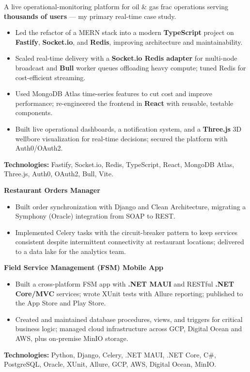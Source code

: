 \documentclass[10pt,a4paper]{altacv}
\begin{document}
A live operational-monitoring platform for oil \& gas frac operations serving \textbf{thousands of users} — my primary real-time case study.
\begin{itemize}
\setlength{\itemindent}{0.5em}
\item[--] Led the refactor of a MERN stack into a modern \textbf{TypeScript} project on \textbf{Fastify}, \textbf{Socket.io}, and \textbf{Redis}, improving architecture and maintainability.
\item[--] Scaled real-time delivery with a \textbf{Socket.io Redis adapter} for multi-node broadcast and \textbf{Bull} worker queues offloading heavy compute; tuned Redis for cost-efficient streaming.
\item[--] Used MongoDB Atlas time-series features to cut cost and improve performance; re-engineered the frontend in \textbf{React} with reusable, testable components.
\item[--] Built live operational dashboards, a notification system, and a \textbf{Three.js} 3D wellbore visualization for real-time decisions; secured the platform with Auth0/OAuth2.
\end{itemize}
\textbf{Technologies:} Fastify, Socket.io, Redis, TypeScript, React, MongoDB Atlas, Three.js, Auth0, OAuth2, Bull, Vite.
\vspace{4mm}


\textbf{Restaurant Orders Manager}
\begin{itemize}
    \setlength{\itemindent}{0.5em}
    \item[--] Built order synchronization with Django and Clean Architecture, migrating a Symphony (Oracle) integration from SOAP to REST.
    \item[--] Implemented Celery tasks with the circuit-breaker pattern to keep services consistent despite intermittent connectivity at restaurant locations; delivered to a data lake for the analytics team.
\end{itemize}

\textbf{Field Service Management (FSM) Mobile App}
\begin{itemize}
    \setlength{\itemindent}{0.5em}
    \item[--] Built a cross-platform FSM app with \textbf{.NET MAUI} and RESTful \textbf{.NET Core/MVC} services; wrote XUnit tests with Allure reporting; published to the App Store and Play Store.
    \item[--] Created and maintained database procedures, views, and triggers for critical business logic; managed cloud infrastructure across GCP, Digital Ocean and AWS, plus on-premise MinIO storage.
\end{itemize}
\textbf{Technologies:} Python, Django, Celery, .NET MAUI, .NET Core, C\#, PostgreSQL, Oracle, XUnit, Allure, GCP, AWS, Digital Ocean, MinIO.
\vspace{4mm}
\end{document}
